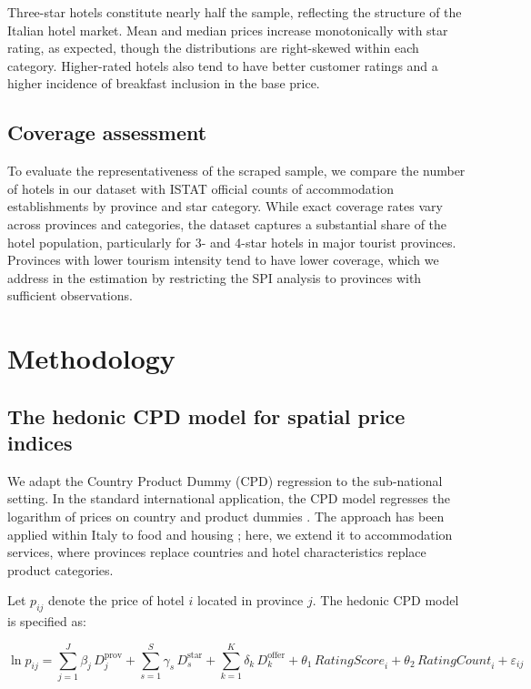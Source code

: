 \documentclass[12pt,a4paper]{article}
\begin{document}
Three-star hotels constitute nearly half the sample, reflecting the structure of the Italian hotel market. Mean and median prices increase monotonically with star rating, as expected, though the distributions are right-skewed within each category. Higher-rated hotels also tend to have better customer ratings and a higher incidence of breakfast inclusion in the base price.

\subsection{Coverage assessment}

To evaluate the representativeness of the scraped sample, we compare the number of hotels in our dataset with ISTAT official counts of accommodation establishments by province and star category. While exact coverage rates vary across provinces and categories, the dataset captures a substantial share of the hotel population, particularly for 3- and 4-star hotels in major tourist provinces. Provinces with lower tourism intensity tend to have lower coverage, which we address in the estimation by restricting the SPI analysis to provinces with sufficient observations.

\section{Methodology}
\label{sec:methodology}

\subsection{The hedonic CPD model for spatial price indices}

We adapt the Country Product Dummy (CPD) regression to the sub-national setting. In the standard international application, the CPD model regresses the logarithm of prices on country and product dummies \citep{rao2005equivalence}. The approach has been applied within Italy to food and housing \citep{laureti2020spatial, biggeri2022housing}; here, we extend it to accommodation services, where provinces replace countries and hotel characteristics replace product categories.

Let $p_{ij}$ denote the price of hotel $i$ located in province $j$. The hedonic CPD model is specified as:

\begin{equation}
\label{eq:cpd}
\ln p_{ij} = \sum_{j=1}^{J} \beta_j \, D_j^{\text{prov}} + \sum_{s=1}^{S} \gamma_s \, D_s^{\text{star}} + \sum_{k=1}^{K} \delta_k \, D_k^{\text{offer}} + \theta_1 \, \textit{RatingScore}_i + \theta_2 \, \textit{RatingCount}_i + \varepsilon_{ij}
\end{equation}
\end{document}
